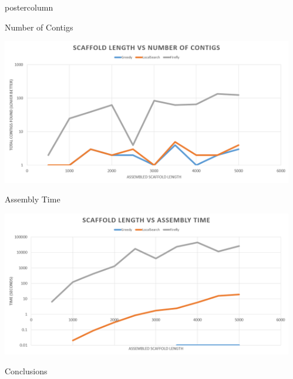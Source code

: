 \documentclass[final,hyperref={pdfpagelabels=false}]{beamer}
\newlength{\columnheight}
\begin{document}
\begin{frame}
\begin{columns}
\begin{column}{.32\textwidth}
        \end{column}
        \begin{column}{.32\textwidth}
            \begin{beamercolorbox}[center,wd=\textwidth]{postercolumn}
                \begin{minipage}[T]{.95\textwidth}
                    \parbox[t][\columnheight]{\textwidth}{
                        \begin{block}{Number of Contigs}
                            \begin{center}
                                \includegraphics[scale=0.66]{num_contigs_poster}
                            \end{center}
                        \end{block}
                        \begin{block}{Assembly Time}
                            \begin{center}
                                \includegraphics[scale=0.66]{assembly_time_poster}
                            \end{center}
                        \end{block}
                        \begin{block}{Conclusions}

\end{block}}
\end{minipage}
\end{beamercolorbox}
\end{column}
\end{columns}
\end{frame}
\end{document}
